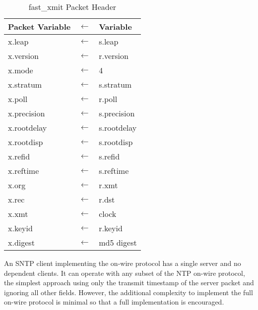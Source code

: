 \begin{table}[htb]
  \center
  \begin{tabular}{| l c l |}
    \hline
    Packet Variable & $ \leftarrow $ & Variable \\
    \hline
    \hline
    x.leap      & $ \leftarrow $ & s.leap      \\
    x.version   & $ \leftarrow $ & r.version   \\
    x.mode      & $ \leftarrow $ & 4           \\
    x.stratum   & $ \leftarrow $ & s.stratum   \\
    x.poll      & $ \leftarrow $ & r.poll      \\
    x.precision & $ \leftarrow $ & s.precision \\
    x.rootdelay & $ \leftarrow $ & s.rootdelay \\
    x.rootdisp  & $ \leftarrow $ & s.rootdisp  \\
    x.refid     & $ \leftarrow $ & s.refid     \\
    x.reftime   & $ \leftarrow $ & s.reftime   \\
    x.org       & $ \leftarrow $ & r.xmt       \\
    x.rec       & $ \leftarrow $ & r.dst       \\
    x.xmt       & $ \leftarrow $ & clock       \\
    x.keyid     & $ \leftarrow $ & r.keyid     \\
    x.digest    & $ \leftarrow $ & md5 digest  \\
    \hline
  \end{tabular}
  \caption{fast\_xmit Packet Header}
  \label{fast_xmit_packet_header}
\end{table}

An SNTP client implementing the on-wire protocol has a single server
and no dependent clients. It can operate with any subset of the NTP
on-wire protocol, the simplest approach using only the transmit
timestamp of the server packet and ignoring all other fields.
However, the additional complexity to implement the full on-wire
protocol is minimal so that a full implementation is encouraged.

